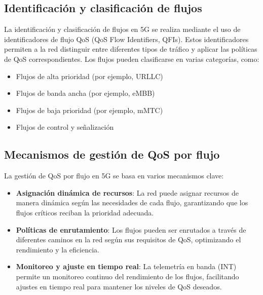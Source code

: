 \subsection{Identificación y clasificación de flujos}
La identificación y clasificación de flujos en 5G se realiza mediante el uso de identificadores de flujo QoS (QoS Flow Identifiers, QFIs). Estos identificadores permiten a la red distinguir entre diferentes tipos de tráfico y aplicar las políticas de QoS correspondientes. Los flujos pueden clasificarse en varias categorías, como:
\begin{itemize}
    \item Flujos de alta prioridad (por ejemplo, URLLC)
    \item Flujos de banda ancha (por ejemplo, eMBB)
    \item Flujos de baja prioridad (por ejemplo, mMTC)
    \item Flujos de control y señalización
\end{itemize}
\subsection{Mecanismos de gestión de QoS por flujo}
La gestión de QoS por flujo en 5G se basa en varios mecanismos clave:
\begin{itemize}
    \item \textbf{Asignación dinámica de recursos}: La red puede asignar recursos de manera dinámica según las necesidades de cada flujo, garantizando que los flujos críticos reciban la prioridad adecuada.
    \item \textbf{Políticas de enrutamiento}: Los flujos pueden ser enrutados a través de diferentes caminos en la red según sus requisitos de QoS, optimizando el rendimiento y la eficiencia.
    \item \textbf{Monitoreo y ajuste en tiempo real}: La telemetría en banda (INT) permite un monitoreo continuo del rendimiento de los flujos, facilitando ajustes en tiempo real para mantener los niveles de QoS deseados.
\end{itemize}
 